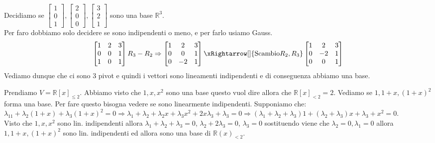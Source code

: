 \begin{example}
Decidiamo se $\begin{bmatrix}1\\0\\1\end{bmatrix}, \begin{bmatrix}2\\0\\0\end{bmatrix}, \begin{bmatrix}3\\2\\1\end{bmatrix}$ sono una base $\mathbb{R}^3$. \\Per faro dobbiamo solo decidere se sono indipendenti o meno, e per farlo usiamo Gauss.
\[
\begin{bmatrix}
1 & 2 & 3\\
0 & 0 & 1\\
1 & 0 & 1
\end{bmatrix}
R_3 - R_2 \Rightarrow
\begin{bmatrix}
1 & 2 & 3\\
0 & 0 & 1\\
0 & -2 & 1
\end{bmatrix}
\xRightarrow[]{\text{Scambio} R_2, R_3}
\begin{bmatrix}
1 & 2 & 3\\
0 & -2 & 1\\
0 & 0 & 1
\end{bmatrix}
\]
Vediamo dunque che ci sono 3 pivot e quindi i vettori sono lineamenti indipendenti e di conseguenza abbiamo una base.
\end{example}

\begin{example}
Prendiamo $V = \mathbb{R}[x]_{\leq 2}$. Abbiamo visto che $1, x, x^2$ sono una base questo vuol dire allora che $\mathbb{R}[x]_{< 2} = 2$. Vediamo se $1, 1+x, (1+x)^2$ forma una base. Per fare questo bisogna vedere se sono linearmente indipendenti. Supponiamo che:
$\lambda_11 + \lambda_2(1+x) + \lambda_3(1+x)^2 = 0 \Rightarrow \lambda_1 + \lambda_2 + \lambda_2x + \lambda_3x^2 + 2x\lambda_3 + \lambda_3 = 0 \Rightarrow (\lambda_1 + \lambda_2 + \lambda_3)1 + (\lambda_2 +\lambda_3)x + \lambda_3 + x^2 = 0$.\\
Visto che $1, x, x^2$ sono lin. indipendenti allora $\lambda_1 + \lambda_2 + \lambda_3 = 0$, $\lambda_2 + 2\lambda_3 = 0$, $\lambda_3 = 0$ sostituendo viene che $\lambda_2 = 0, \lambda_1 = 0$ allora $1, 1+x, (1+x)^2$ sono lin. indipendenti ed allora sono una base di $\mathbb{R}(x)_{<2}$.
\end{example}

